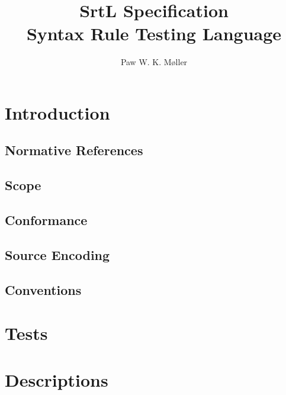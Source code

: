 \documentclass[10pt, a4paper]{article}
\title{SrtL Specification \\ \textbf{S}yntax \textbf{R}ule \textbf{T}esting \textbf{L}anguage}
\author{Paw W. K. Møller}
\begin{document}
    \maketitle
    \clearpage
    
    \tableofcontents
    \clearpage
    
    \setcounter{page}{1}
    \setlength{\parskip}{10pt}

    \maketitle

    \section{Introduction}
    
    
    \subsection{Normative References}
    
    
    \subsection{Scope}
    
    
    \subsection{Conformance}
    
    \clearpage
    
    \subsection{Source Encoding}
    
    
    \subsection{Conventions}
    
    
    \section{Tests}
    
    
    \section{Descriptions}
    
    
\end{document}
